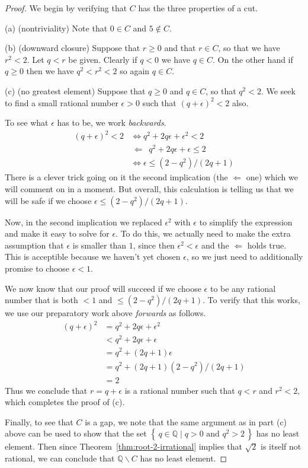 \documentclass[11pt,oneside]{amsbook}
\newcommand{\set}[1]{\left\{\,#1\,\right\}}
\newcommand{\QQ}{\mathbb Q}
\theoremstyle{definition}
\theoremstyle{plain}
\theoremstyle{definition}
\theoremstyle{remark}
\numberwithin{equation}{section}
\numberwithin{figure}{section}
\begin{document}
\begin{proof}
  We begin by verifying that $C$ has the three properties of a cut.

  (a) (nontriviality) Note that $0\in C$ and $5\notin C$.

  (b) (downward closure) Suppose that $r\geq0$ and that $r\in C$, so that we have $r^2<2$. Let $q<r$ be given. Clearly if $q<0$ we have $q\in C$. On the other hand if $q\geq0$ then we have $q^2<r^2<2$ so again $q\in C$.

  (c) (no greatest element) Suppose that $q\geq0$ and $q\in C$, so that $q^2<2$. We seek to find a small rational number $\epsilon>0$ such that $(q+\epsilon)^2<2$ also.

  To see what $\epsilon$ has to be, we work \emph{backwards}.
  \begin{align*}
    (q+\epsilon)^2<2&\iff q^2+2q\epsilon+\epsilon^2<2\\
    &\,\Longleftarrow\,\,\, q^2+2q\epsilon+\epsilon\leq2\\
    &\iff \epsilon\leq(2-q^2)/(2q+1)
  \end{align*}
  There is a clever trick going on it the second implication (the $\Longleftarrow$ one) which we will comment on in a moment. But overall, this calculation is telling us that we will be safe if we choose $\epsilon\leq(2-q^2)/(2q+1)$.

  Now, in the second implication we replaced $\epsilon^2$ with $\epsilon$ to simplify the expression and make it easy to solve for $\epsilon$. To do this, we actually need to make the extra assumption that $\epsilon$ is smaller than $1$, since then $\epsilon^2<\epsilon$ and the $\Longleftarrow$ holds true. This is acceptible because we haven't yet chosen $\epsilon$, so we just need to additionally promise to choose $\epsilon<1$.

  We now know that our proof will succeed if we choose $\epsilon$ to be any rational number that is both $<1$ and $\leq(2-q^2)/(2q+1)$. To verify that this works, we use our preparatory work above \emph{forwards} as follows.
  \begin{align*}
    (q+\epsilon)^2&=q^2+2q\epsilon+\epsilon^2\\
    &<q^2+2q\epsilon+\epsilon\\
    &=q^2+(2q+1)\epsilon\\
    &=q^2+(2q+1)(2-q^2)/(2q+1)\\
    &=2
  \end{align*}
  Thus we conclude that $r=q+\epsilon$ is a rational number such that $q<r$ and $r^2<2$, which completes the proof of (c).

  Finally, to see that $C$ is a gap, we note that the same argument as in part (c) above can be used to show that the set $\set{q\in\QQ\mid q>0\text{ and }q^2>2}$ has no least element. Then since Theorem~\ref{thm:root-2-irrational} implies that $\sqrt2$ is itself not rational, we can conclude that $\QQ\smallsetminus C$ has no least element.
\end{proof}
\end{document}
